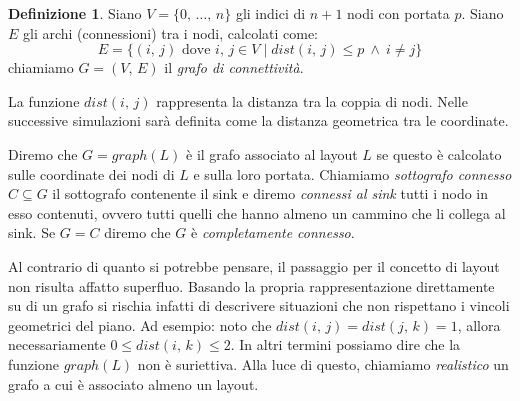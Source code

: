 \documentclass[a4paper,12pt]{article}
\theoremstyle{definition}
\newtheorem{definition}{Definizione}
\begin{document}
\begin{definition}
Siano $V = \{0,\,\dots,\,n\}$ gli indici di $n+1$ nodi con portata $p$. Siano $E$ gli archi (connessioni) tra i nodi, calcolati come:
\begin{equation*}
E = \{ (i,\,j) \text{ dove } i,\,j \in V \mid dist(i,\,j) \le p \ \wedge \ i \neq j\}
\end{equation*}
chiamiamo $G = (V,\,E)$ il \emph{grafo di connettività}.
\end{definition}


La funzione $dist(i,\,j)$ rappresenta la distanza tra la coppia di nodi. Nelle successive simulazioni sarà definita come la distanza geometrica tra le coordinate.


Diremo che $G = graph(L)$ è il grafo associato al layout $L$ se questo è calcolato sulle coordinate dei nodi di $L$ e sulla loro portata. Chiamiamo \emph{sottografo connesso} $C \subseteq G$ il sottografo contenente il sink e diremo \emph{connessi al sink} tutti i nodo in esso contenuti, ovvero tutti quelli che hanno almeno un cammino che li collega al sink. Se $G = C$ diremo che $G$ è \emph{completamente connesso}.

Al contrario di quanto si potrebbe pensare, il passaggio per il concetto di layout non risulta affatto superfluo. Basando la propria rappresentazione direttamente su di un grafo si rischia infatti di descrivere situazioni che non rispettano i vincoli geometrici del piano. Ad esempio: noto che $dist(i,\,j) = dist(j,\,k) = 1$, allora necessariamente $0 \leq dist(i,\,k) \leq 2$. In altri termini possiamo dire che la funzione $graph(L)$ non è suriettiva. Alla luce di questo, chiamiamo \emph{realistico} un grafo a cui è associato almeno un layout.
\end{document}
